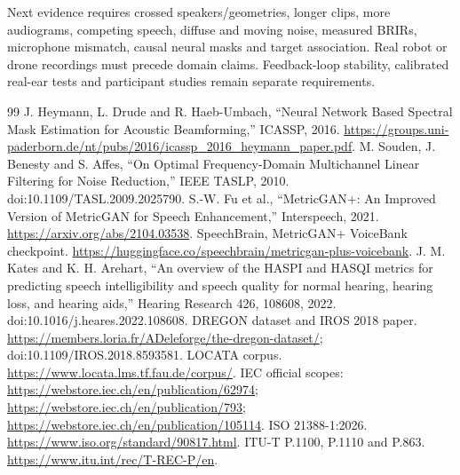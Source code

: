 \documentclass[10pt,a4paper]{article}
\begin{document}
Next evidence requires crossed speakers/geometries, longer clips, more audiograms, competing speech, diffuse and moving noise, measured BRIRs, microphone mismatch, causal neural masks and target association. Real robot or drone recordings must precede domain claims. Feedback-loop stability, calibrated real-ear tests and participant studies remain separate requirements.

\begin{thebibliography}{99}
 J. Heymann, L. Drude and R. Haeb-Umbach, ``Neural Network Based Spectral Mask Estimation for Acoustic Beamforming,'' ICASSP, 2016. \url{https://groups.uni-paderborn.de/nt/pubs/2016/icassp_2016_heymann_paper.pdf}.
 M. Souden, J. Benesty and S. Affes, ``On Optimal Frequency-Domain Multichannel Linear Filtering for Noise Reduction,'' IEEE TASLP, 2010. doi:10.1109/TASL.2009.2025790.
 S.-W. Fu et al., ``MetricGAN+: An Improved Version of MetricGAN for Speech Enhancement,'' Interspeech, 2021. \url{https://arxiv.org/abs/2104.03538}.
 SpeechBrain, MetricGAN+ VoiceBank checkpoint. \url{https://huggingface.co/speechbrain/metricgan-plus-voicebank}.
 J. M. Kates and K. H. Arehart, ``An overview of the HASPI and HASQI metrics for predicting speech intelligibility and speech quality for normal hearing, hearing loss, and hearing aids,'' Hearing Research 426, 108608, 2022. doi:10.1016/j.heares.2022.108608.
 DREGON dataset and IROS 2018 paper. \url{https://members.loria.fr/ADeleforge/the-dregon-dataset/}; doi:10.1109/IROS.2018.8593581.
 LOCATA corpus. \url{https://www.locata.lms.tf.fau.de/corpus/}.
 IEC official scopes: \url{https://webstore.iec.ch/en/publication/62974}; \url{https://webstore.iec.ch/en/publication/793}; \url{https://webstore.iec.ch/en/publication/105114}.
 ISO 21388-1:2026. \url{https://www.iso.org/standard/90817.html}.
 ITU-T P.1100, P.1110 and P.863. \url{https://www.itu.int/rec/T-REC-P/en}.
\end{thebibliography}
\end{document}
